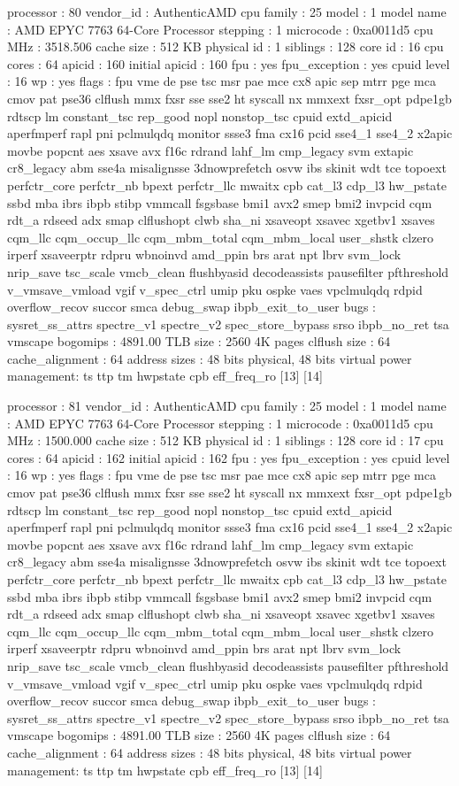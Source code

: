 processor	: 80
vendor_id	: AuthenticAMD
cpu family	: 25
model		: 1
model name	: AMD EPYC 7763 64-Core Processor
stepping	: 1
microcode	: 0xa0011d5
cpu MHz		: 3518.506
cache size	: 512 KB
physical id	: 1
siblings	: 128
core id		: 16
cpu cores	: 64
apicid		: 160
initial apicid	: 160
fpu		: yes
fpu_exception	: yes
cpuid level	: 16
wp		: yes
flags		: fpu vme de pse tsc msr pae mce cx8 apic sep mtrr pge mca cmov pat pse36 clflush mmx fxsr sse sse2 ht syscall nx mmxext fxsr_opt pdpe1gb rdtscp lm constant_tsc rep_good nopl nonstop_tsc cpuid extd_apicid aperfmperf rapl pni pclmulqdq monitor ssse3 fma cx16 pcid sse4_1 sse4_2 x2apic movbe popcnt aes xsave avx f16c rdrand lahf_lm cmp_legacy svm extapic cr8_legacy abm sse4a misalignsse 3dnowprefetch osvw ibs skinit wdt tce topoext perfctr_core perfctr_nb bpext perfctr_llc mwaitx cpb cat_l3 cdp_l3 hw_pstate ssbd mba ibrs ibpb stibp vmmcall fsgsbase bmi1 avx2 smep bmi2 invpcid cqm rdt_a rdseed adx smap clflushopt clwb sha_ni xsaveopt xsavec xgetbv1 xsaves cqm_llc cqm_occup_llc cqm_mbm_total cqm_mbm_local user_shstk clzero irperf xsaveerptr rdpru wbnoinvd amd_ppin brs arat npt lbrv svm_lock nrip_save tsc_scale vmcb_clean flushbyasid decodeassists pausefilter pfthreshold v_vmsave_vmload vgif v_spec_ctrl umip pku ospke vaes vpclmulqdq rdpid overflow_recov succor smca debug_swap ibpb_exit_to_user
bugs		: sysret_ss_attrs spectre_v1 spectre_v2 spec_store_bypass srso ibpb_no_ret tsa vmscape
bogomips	: 4891.00
TLB size	: 2560 4K pages
clflush size	: 64
cache_alignment	: 64
address sizes	: 48 bits physical, 48 bits virtual
power management: ts ttp tm hwpstate cpb eff_freq_ro [13] [14]

processor	: 81
vendor_id	: AuthenticAMD
cpu family	: 25
model		: 1
model name	: AMD EPYC 7763 64-Core Processor
stepping	: 1
microcode	: 0xa0011d5
cpu MHz		: 1500.000
cache size	: 512 KB
physical id	: 1
siblings	: 128
core id		: 17
cpu cores	: 64
apicid		: 162
initial apicid	: 162
fpu		: yes
fpu_exception	: yes
cpuid level	: 16
wp		: yes
flags		: fpu vme de pse tsc msr pae mce cx8 apic sep mtrr pge mca cmov pat pse36 clflush mmx fxsr sse sse2 ht syscall nx mmxext fxsr_opt pdpe1gb rdtscp lm constant_tsc rep_good nopl nonstop_tsc cpuid extd_apicid aperfmperf rapl pni pclmulqdq monitor ssse3 fma cx16 pcid sse4_1 sse4_2 x2apic movbe popcnt aes xsave avx f16c rdrand lahf_lm cmp_legacy svm extapic cr8_legacy abm sse4a misalignsse 3dnowprefetch osvw ibs skinit wdt tce topoext perfctr_core perfctr_nb bpext perfctr_llc mwaitx cpb cat_l3 cdp_l3 hw_pstate ssbd mba ibrs ibpb stibp vmmcall fsgsbase bmi1 avx2 smep bmi2 invpcid cqm rdt_a rdseed adx smap clflushopt clwb sha_ni xsaveopt xsavec xgetbv1 xsaves cqm_llc cqm_occup_llc cqm_mbm_total cqm_mbm_local user_shstk clzero irperf xsaveerptr rdpru wbnoinvd amd_ppin brs arat npt lbrv svm_lock nrip_save tsc_scale vmcb_clean flushbyasid decodeassists pausefilter pfthreshold v_vmsave_vmload vgif v_spec_ctrl umip pku ospke vaes vpclmulqdq rdpid overflow_recov succor smca debug_swap ibpb_exit_to_user
bugs		: sysret_ss_attrs spectre_v1 spectre_v2 spec_store_bypass srso ibpb_no_ret tsa vmscape
bogomips	: 4891.00
TLB size	: 2560 4K pages
clflush size	: 64
cache_alignment	: 64
address sizes	: 48 bits physical, 48 bits virtual
power management: ts ttp tm hwpstate cpb eff_freq_ro [13] [14]

